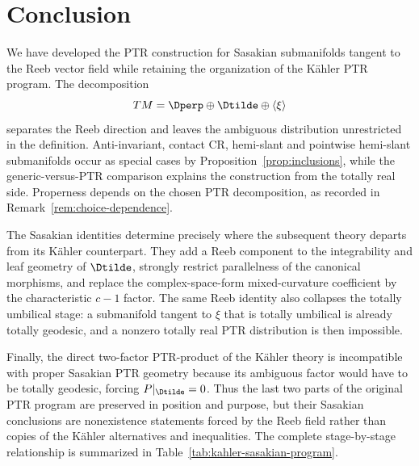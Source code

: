 \documentclass[11pt]{article}
\theoremstyle{definition}\newtheorem{definition}[theorem]{Definition}\newtheorem{example}[theorem]{Example}
\theoremstyle{remark}\newtheorem{remark}[theorem]{Remark}
\begin{document}
\section*{Conclusion}
We have developed the PTR construction for Sasakian submanifolds tangent
to the Reeb vector field while retaining the organization of the K\"ahler
PTR program.  The decomposition
\[
 TM=\Dperp\oplus\Dtilde\oplus\langle\xi\rangle
\]
separates the Reeb direction and leaves the ambiguous distribution
unrestricted in the definition.  Anti-invariant, contact CR, hemi-slant and pointwise hemi-slant
submanifolds occur as special cases by Proposition~\ref{prop:inclusions},
while the generic-versus-PTR comparison explains the construction from the
totally real side.  Properness depends on the chosen PTR decomposition, as
recorded in Remark~\ref{rem:choice-dependence}.

The Sasakian identities determine precisely where the subsequent theory
departs from its K\"ahler counterpart.  They add a Reeb component to the
integrability and leaf geometry of \(\Dtilde\), strongly restrict
parallelness of the canonical morphisms, and replace the complex-space-form
mixed-curvature coefficient by the characteristic \(c-1\) factor.  The
same Reeb identity also collapses the totally umbilical stage:
a submanifold tangent to \(\xi\) that is totally umbilical is already
totally geodesic, and a nonzero totally real PTR distribution is then
impossible.

Finally, the direct two-factor PTR-product of the K\"ahler theory is
incompatible with proper Sasakian PTR geometry because its ambiguous
factor would have to be totally geodesic, forcing
\(P|_{\Dtilde}=0\).  Thus the last two parts of the original PTR program
are preserved in position and purpose, but their Sasakian conclusions are
nonexistence statements forced by the Reeb field rather than copies of the K\"ahler alternatives and inequalities.
The complete stage-by-stage relationship is summarized in
Table~\ref{tab:kahler-sasakian-program}.
\end{document}
